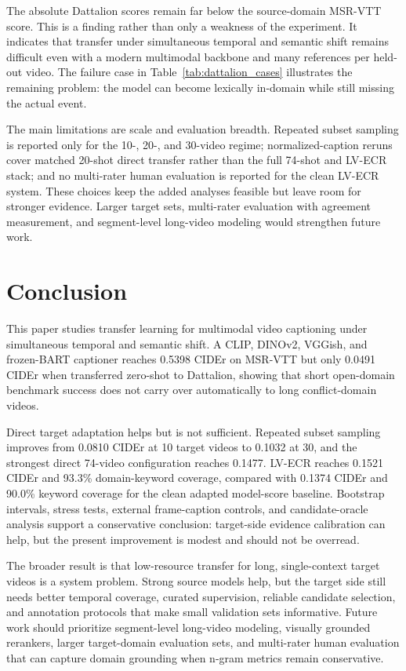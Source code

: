 \documentclass[pdflatex,sn-mathphys-num]{sn-jnl}
\theoremstyle{thmstyleone}
\theoremstyle{thmstyletwo}
\theoremstyle{thmstylethree}
\begin{document}
The absolute Dattalion scores remain far below the source-domain MSR-VTT score. This is a finding rather than only a weakness of the experiment. It indicates that transfer under simultaneous temporal and semantic shift remains difficult even with a modern multimodal backbone and many references per held-out video. The failure case in Table~\ref{tab:dattalion_cases} illustrates the remaining problem: the model can become lexically in-domain while still missing the actual event.

The main limitations are scale and evaluation breadth. Repeated subset sampling is reported only for the 10-, 20-, and 30-video regime; normalized-caption reruns cover matched 20-shot direct transfer rather than the full 74-shot and LV-ECR stack; and no multi-rater human evaluation is reported for the clean LV-ECR system. These choices keep the added analyses feasible but leave room for stronger evidence. Larger target sets, multi-rater evaluation with agreement measurement, and segment-level long-video modeling would strengthen future work.

\section{Conclusion}\label{sec8}
This paper studies transfer learning for multimodal video captioning under simultaneous temporal and semantic shift. A CLIP, DINOv2, VGGish, and frozen-BART captioner reaches 0.5398 CIDEr on MSR-VTT but only 0.0491 CIDEr when transferred zero-shot to Dattalion, showing that short open-domain benchmark success does not carry over automatically to long conflict-domain videos.

Direct target adaptation helps but is not sufficient. Repeated subset sampling improves from 0.0810 CIDEr at 10 target videos to 0.1032 at 30, and the strongest direct 74-video configuration reaches 0.1477. LV-ECR reaches 0.1521 CIDEr and 93.3\% domain-keyword coverage, compared with 0.1374 CIDEr and 90.0\% keyword coverage for the clean adapted model-score baseline. Bootstrap intervals, stress tests, external frame-caption controls, and candidate-oracle analysis support a conservative conclusion: target-side evidence calibration can help, but the present improvement is modest and should not be overread.

The broader result is that low-resource transfer for long, single-context target videos is a system problem. Strong source models help, but the target side still needs better temporal coverage, curated supervision, reliable candidate selection, and annotation protocols that make small validation sets informative. Future work should prioritize segment-level long-video modeling, visually grounded rerankers, larger target-domain evaluation sets, and multi-rater human evaluation that can capture domain grounding when n-gram metrics remain conservative.
\end{document}
